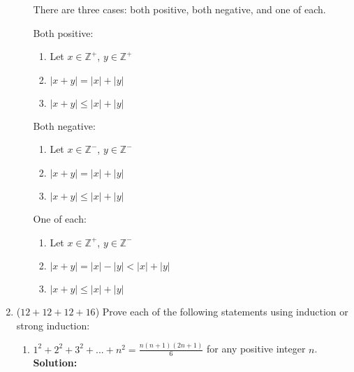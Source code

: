 \documentclass[12pt]{article}
\begin{document}
\begin{enumerate}
\begin{enumerate}
		There are three cases: both positive, both negative, and one of each.

		Both positive:
		\begin{enumerate}
			\item Let $x \in \mathbb{Z}^+$, $y \in \mathbb{Z}^+$
			\item $|x + y|= |x| + |y|$
			\item $|x + y| \leq |x| + |y|$
		\end{enumerate}

		Both negative:
		\begin{enumerate}
			\item Let $x \in \mathbb{Z}^-$, $y \in \mathbb{Z}^-$
			\item $|x + y| = |x| + |y|$
			\item $|x + y| \leq |x| + |y|$
		\end{enumerate}

		One of each:
		\begin{enumerate}
			\item Let $x \in \mathbb{Z}^+$, $y \in \mathbb{Z}^-$
			\item $|x + y| = |x| - |y| < |x| + |y|$
			\item $|x + y| \leq |x| + |y|$
		\end{enumerate}

		\newpage

	\end{enumerate}

	\item ($12+12+12+16$) Prove each of the following statements using induction or strong induction:
	\begin{enumerate}

		\item
		$1^2 + 2^2 + 3^2 +...+ n^2 = \frac{n(n+1)(2n+1)}{6}$ for any positive integer $n$.\\
		{\bf Solution:}\\


\end{enumerate}
\end{enumerate}
\end{document}
